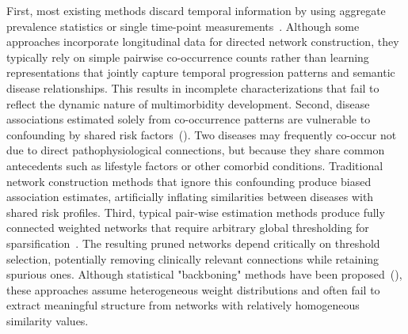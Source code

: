 First, most existing methods discard temporal information by using aggregate prevalence statistics or single time-point measurements~\citet{jeong2017network, dervic2025comorbidity}. Although some approaches incorporate longitudinal data for directed network construction, they typically rely on simple pairwise co-occurrence counts rather than learning representations that jointly capture temporal progression patterns and semantic disease relationships. This results in incomplete characterizations that fail to reflect the dynamic nature of multimorbidity development. Second, disease associations estimated solely from co-occurrence patterns are vulnerable to confounding by shared risk factors~(\citealp{vanderweele2013definition, pearl2009causality}). Two diseases may frequently co-occur not due to direct pathophysiological connections, but because they share common antecedents such as lifestyle factors or other comorbid conditions. Traditional network construction methods that ignore this confounding produce biased association estimates, artificially inflating similarities between diseases with shared risk profiles. Third, typical pair-wise estimation methods produce fully connected weighted networks that require arbitrary global thresholding for sparsification~\citet{masuda2025}. The resulting pruned networks depend critically on threshold selection, potentially removing clinically relevant connections while retaining spurious ones. Although statistical "backboning" methods have been proposed~(\citealp{serrano2009extracting, foti2011nonparametric}), these approaches assume heterogeneous weight distributions and often fail to extract meaningful structure from networks with relatively homogeneous similarity values.




